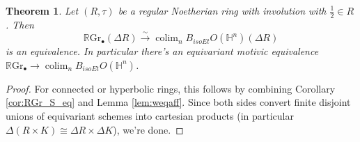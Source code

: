 \documentclass[edeposit,fullpage]{uiucthesis2009}
\newcommand{\mbb}{\mathbb}
\newcommand{\mc}{\mathcal}
\newcommand{\RGr}{\mathbb R\mathrm{Gr}}
\DeclareMathOperator*{\colim}{colim}
\theoremstyle{plain}
\numberwithin{lemma}{section}
\newtheorem{theorem}[lemma]{Theorem}
\theoremstyle{definition}
\begin{document}
\begin{theorem}\label{thm:RGr_Bet}
Let $(R,\tau)$ be a regular Noetherian ring with involution with
$\frac{1}{2} \in R$. Then
\[
\RGr_\bullet(\Delta R) \xrightarrow{\sim} \colim_n B_{isoEt}O(\mbb H^n)(\Delta R)
\]
is an equivalence.
In particular there's an equivariant motivic equivalence $\RGr_\bullet
\rightarrow \colim_n B_{isoEt}O(\mbb H^n)$.
\end{theorem}

\begin{proof}
For connected or hyperbolic rings, this follows by combining Corollary
\ref{cor:RGr_S_eq} and Lemma \ref{lem:weqaff}. Since both sides
convert finite disjoint unions of equivariant schemes into cartesian
products (in particular $\Delta(R
\times K) \cong \Delta R \times \Delta K$), we're done.
\end{proof}



\end{document}
